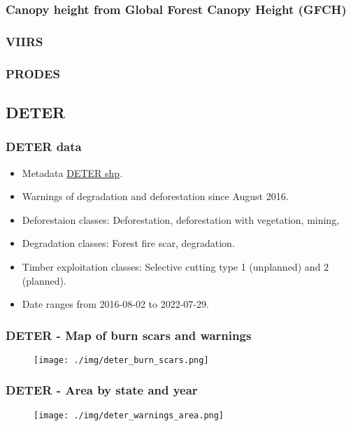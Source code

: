 \documentclass{beamer}
\begin{document}
\begin{frame}
    \frametitle{Canopy height from Global Forest Canopy Height (GFCH)}
\end{frame}

\begin{frame}
    \frametitle{VIIRS}
\end{frame}

\begin{frame}
    \frametitle{PRODES}
\end{frame}



\subsection{DETER}



\begin{frame}[fragile]
    \frametitle{DETER data}
    \begin{itemize}
        \item Metadata \href{http://terrabrasilis.dpi.inpe.br/geonetwork/srv/por/catalog.search#/metadata/f2153c4a-915b-48a6-8658-963bdce7366c}{DETER shp}.
        \item Warnings of degradation and deforestation since August 2016.
        \item Deforestaion classes: Deforestation, deforestation with 
            vegetation, mining, 
        \item Degradation classes: Forest fire scar, degradation.
        \item Timber exploitation classes: Selective cutting type 1 (unplanned) 
            and 2 (planned).
        \item Date ranges from 2016-08-02 to 2022-07-29.
    \end{itemize}
\end{frame}



\begin{frame}
    \frametitle{DETER - Map of burn scars and warnings}
    \begin{figure}
        \centering
        \texttt{[image: ./img/deter\_burn\_scars.png]}
    \end{figure}
\end{frame}



\begin{frame}
    \frametitle{DETER - Area by state and year}
    \begin{figure}
        \centering
        \texttt{[image: ./img/deter\_warnings\_area.png]}
    \end{figure}
\end{frame}
\end{document}
